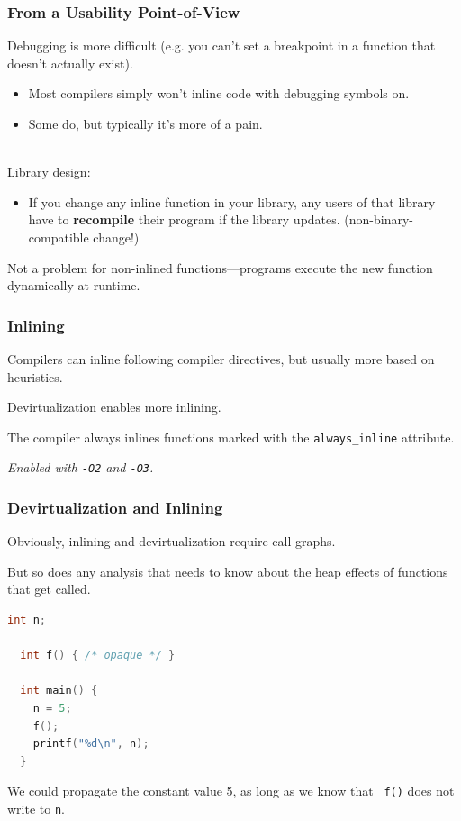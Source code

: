 \begin{frame}
  \frametitle{From a Usability Point-of-View}

  
  Debugging is more difficult (e.g. you can't set a breakpoint in a function that
  doesn't actually exist).
  \begin{itemize}
    \item Most compilers simply won't inline code with debugging symbols on.
    \item Some do, but typically it's more of a pain.
  \end{itemize}~\\[1em]

  Library design:
  \begin{itemize}
    \item If you change any inline function in your library, any users
      of that library have to {\bf recompile} their program if the
      library updates. (non-binary-compatible change!)
  \end{itemize}
  Not a problem for non-inlined functions---programs execute the new function
      dynamically at runtime.

  
\end{frame}


\begin{frame}
\frametitle{Inlining}

 Compilers can inline following compiler directives, but usually more based on heuristics. 
 
 Devirtualization enables more inlining. 
 
 The compiler always inlines functions marked with the {\tt always\_inline} attribute.

\noindent \emph{Enabled with {\tt -O2} and {\tt -O3}.}

\end{frame}

\begin{frame}[fragile]
\frametitle{Devirtualization and Inlining}

Obviously, inlining and devirtualization require call graphs. 

But so
does any analysis that needs to know about the heap effects of
functions that get called.


\begin{lstlisting}[language=C]
  int n;

  int f() { /* opaque */ }

  int main() {
    n = 5;
    f();
    printf("%d\n", n);
  }
\end{lstlisting}

We could propagate the constant value 5, as long as we know that {\tt
  f()} does not write to {\tt n}.


\end{frame}

